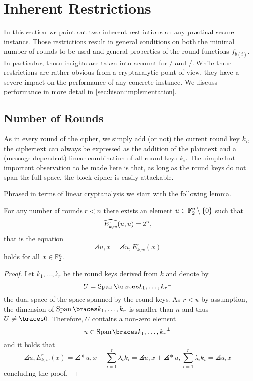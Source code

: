 \section{Inherent Restrictions}\label{bison:sec:restrictions}
In this section we point out two inherent restrictions on any practical secure instance.
Those restrictions result in general conditions on both the minimal number of rounds to be used and general properties of the round functions $f_{b(i)}$.
In particular, those insights are taken into account for \bison/ and \wisent/.
While these restrictions are rather obvious from a cryptanalytic point of view, they have a severe impact on the performance of any concrete instance.
We discuss performance in more detail in \cref{sec:bison:implementation}.

\subsection{Number of Rounds}
As in every round of the cipher, we simply add (or not) the current round key $k_i$, the ciphertext can always be expressed as the addition of the plaintext and a (message dependent) linear combination of all round keys $k_i$.
The simple but important observation to be made here is that, as long as the round keys do not span the full space, the block cipher is easily attackable.

Phrased in terms of linear cryptanalysis we start with the following lemma.
\begin{lemma}\label{lem:wsn:prob_one_mask}
    For any number of rounds $r<n$ there exists an element $u \in \mathbb{F}_2^n\setminus\{0\}$ such that
    \begin{equation*}
        \widehat{E_{k,w}^r}(u,u)=2^n,
    \end{equation*}
    that is the equation
    \begin{equation*}
        \angles{u, x} = \angles{u, E_{k,w}^r(x)}
    \end{equation*}
    holds for all $x \in \mathbb{F}_2^n$.
\end{lemma}
\begin{proof}
    Let $k_1, \dots, k_{r}$ be the round keys derived from $k$ and denote by
    \begin{equation*}
        U = \Span{k_1, \dots, k_{r}}^{\perp}
    \end{equation*}
    the dual space of the space spanned by the round keys.
    As $r<n$ by assumption, the dimension of $\Span{k_1, \dots, k_{r}}$ is smaller than $n$ and thus $U \neq \set{0}$.
    Therefore, $U$ contains a non-zero element
    \begin{equation*}
        u \in \Span{k_1, \dots, k_{r}}^{\perp}
    \end{equation*}
    and it holds that
    \begin{equation*}
        \angles{u, E_{k,w}^r(x)}
        = \angles*{u, x + \sum_{i=1}^{r} \lambda_i k_i}
        = \angles{u, x} + \angles*{u, \sum_{i=1}^{r} \lambda_i k_i}
        = \angles{u, x}
    \end{equation*}
    concluding the proof.
\end{proof}

